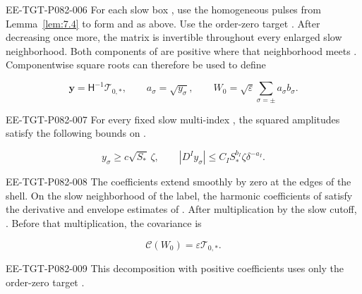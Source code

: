 \begin{proposition}\label{prop:7.5}
\begin{EESegment}{EE-TGT-P082-006}
For each slow box , use the homogeneous pulses from Lemma~\ref{lem:7.4} to form  and  as above. Use the order-zero target . After decreasing  once more, the matrix  is invertible throughout every enlarged slow neighborhood. Both components of  are positive where that neighborhood meets . Componentwise square roots can therefore be used to define
\end{EESegment}
\begin{equation}
  \boldsymbol y=\mathsf H^{-1}\mathcal T_{0,*},
  \qquad a_\sigma=\sqrt{y_\sigma},
  \qquad W_0=\sqrt{\varepsilon}\sum_{\sigma=\pm}a_\sigma b_\sigma.
  \tag{7.24}\label{eq:7.24}
\end{equation}
\begin{EESegment}{EE-TGT-P082-007}
For every fixed slow multi-index , the squared amplitudes satisfy the following bounds on .
\end{EESegment}
\begin{equation}
  y_\sigma\geq c\sqrt{S_*}\,\zeta,
  \qquad
  |D^Iy_\sigma|\leq C_IS_*^{b_I}\zeta\delta^{-a_I}.
  \tag{7.25}\label{eq:7.25}
\end{equation}
\begin{EESegment}{EE-TGT-P082-008}
The coefficients  extend smoothly by zero at the edges of the shell. On the slow neighborhood of the label, the harmonic coefficients of  satisfy the derivative and envelope estimates of . After multiplication by the slow cutoff, . Before that multiplication, the covariance is
\end{EESegment}
\begin{equation}
  \mathcal C(W_0)=\varepsilon\mathcal T_{0,*}.
  \tag{7.26}\label{eq:7.26}
\end{equation}
\begin{EESegment}{EE-TGT-P082-009}
This decomposition with positive coefficients uses only the order-zero target .
\end{EESegment}
\end{proposition}

